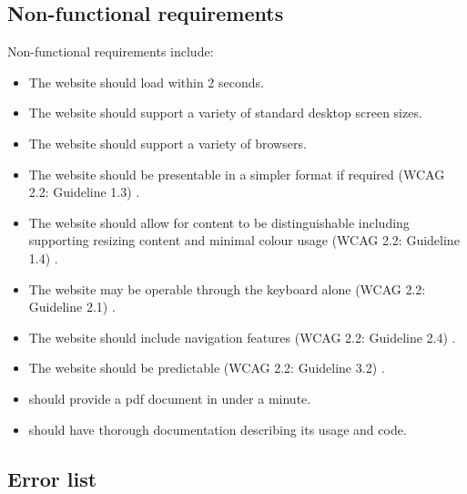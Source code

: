 \subsection{Non-functional requirements}\label{appendix:non_func_requirements}
Non-functional requirements include:
\begin{itemize}
    \item The website should load within 2 seconds.
    \item The website should support a variety of standard desktop screen sizes.
    \item The website should support a variety of browsers.
    \item The website should be presentable in a simpler format if required (WCAG 2.2: Guideline 1.3) \cite{wcag}.
    \item The website should allow for content to be distinguishable including supporting resizing content and minimal colour usage (WCAG 2.2: Guideline 1.4) \cite{wcag}.
    \item The website may be operable through the keyboard alone (WCAG 2.2: Guideline 2.1) \cite{wcag}.
    \item The website should include navigation features (WCAG 2.2: Guideline 2.4) \cite{wcag}.
    \item The website should be predictable (WCAG 2.2: Guideline 3.2) \cite{wcag}.
    \item \lintexspaced should provide a \acrshort{pdf} document in under a minute.
    \item \lintexspaced should have thorough documentation describing its usage and code.
\end{itemize}
\clearpage

\subsection{Error list}\label{appendix:err_list}

